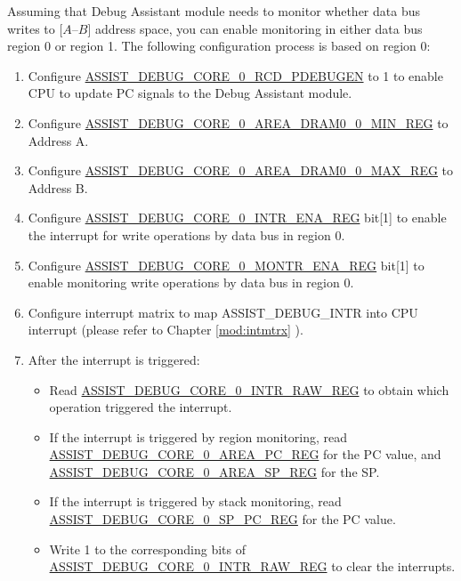 \documentclass[main\_\_EN.tex]{subfiles}
\begin{document}
Assuming that Debug Assistant module needs to monitor whether data bus writes to [$A – B$] address space, you can enable monitoring in either data bus region 0 or region 1. The following configuration process is based on region 0:
\begin{enumerate}
    \item Configure \hyperref[fielddesc:ASSISTDEBUGCORE0RCDPDEBUGEN]{ASSIST\_DEBUG\_CORE\_0\_RCD\_PDEBUGEN} to 1 to enable CPU to update PC signals to the Debug Assistant module.
    \item Configure \hyperref[regdesc:ASSISTDEBUGCORE0AREADRAM00MINREG]{ASSIST\_DEBUG\_CORE\_0\_AREA\_DRAM0\_0\_MIN\_REG} to Address A.
    \item Configure \hyperref[regdesc:ASSISTDEBUGCORE0AREADRAM00MAXREG]{ASSIST\_DEBUG\_CORE\_0\_AREA\_DRAM0\_0\_MAX\_REG} to Address B.
    \item Configure \hyperref[regdesc:ASSISTDEBUGCORE0INTRENAREG]{ASSIST\_DEBUG\_CORE\_0\_INTR\_ENA\_REG} bit[1] to enable the interrupt for write operations by data bus in region 0.
    \item Configure \hyperref[regdesc:ASSISTDEBUGCORE0MONTRENAREG]{ASSIST\_DEBUG\_CORE\_0\_MONTR\_ENA\_REG} bit[1] to enable monitoring write operations by data bus in region 0.
    \item Configure interrupt matrix to map ASSIST\_DEBUG\_INTR into CPU interrupt (please refer to Chapter \ref{mod:intmtrx} \textit{}).
    \item After the interrupt is triggered:
    
    \begin{itemize}
        \item Read \hyperref[regdesc:ASSISTDEBUGCORE0INTRRAWREG]{ASSIST\_DEBUG\_CORE\_0\_INTR\_RAW\_REG} to obtain which operation triggered the interrupt.
        
        \item If the interrupt is triggered by region monitoring, read \hyperref[regdesc:ASSISTDEBUGCORE0AREAPCREG]{ASSIST\_DEBUG\_CORE\_0\_AREA\_PC\_REG} for the PC value, and \hyperref[regdesc:ASSISTDEBUGCORE0AREASPREG]{ASSIST\_DEBUG\_CORE\_0\_AREA\_SP\_REG} for the SP.
        
        \item If the interrupt is triggered by stack monitoring, read \hyperref[regdesc:ASSISTDEBUGCORE0SPPCREG]{ASSIST\_DEBUG\_CORE\_0\_SP\_PC\_REG} for the PC value.
        
        \item Write 1 to the corresponding bits of \hyperref[regdesc:ASSISTDEBUGCORE0INTRRAWREG]{ASSIST\_DEBUG\_CORE\_0\_INTR\_RAW\_REG} to clear the interrupts.
    \end{itemize}

\end{enumerate}
\end{document}
